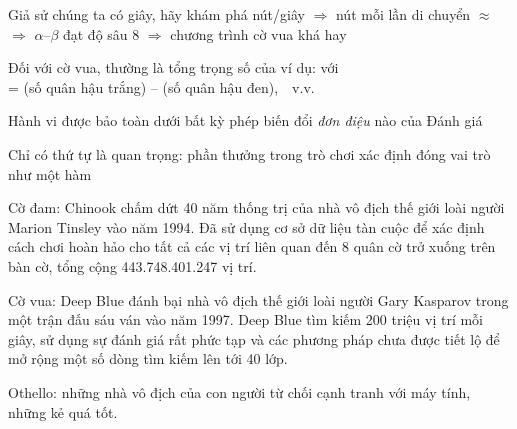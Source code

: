 \documentclass{article}
\begin{document}
\begin{huge}
Giả sử chúng ta có  giây, hãy khám phá  nút/giây\nl
$\Rightarrow$  nút mỗi lần di chuyển $\approx$ \nl
$\Rightarrow$ $\alpha$--$\beta$ đạt độ sâu 8 $\Rightarrow$ chương trình cờ vua khá hay



\vspace*{0.2in}

\textwidth
{}

Đối với cờ vua, thường là tổng trọng số  của 
\mat{\[
{\sc Eval}(s) = w_1 f_1(s) + w_2 f_2(s) + \ldots + w_n f_n(s)
\]}
ví dụ:  với \\
 = (số quân hậu trắng) -- (số quân hậu đen),\ \ v.v.





\vspace*{0.3in}

\textwidth
{}

Hành vi được bảo toàn dưới bất kỳ phép biến đổi \emph{đơn điệu} nào của
{\sc Đánh giá}

Chỉ có thứ tự là quan trọng:\nl
phần thưởng trong trò chơi xác định đóng vai trò như một hàm 




Cờ đam: Chinook chấm dứt 40 năm thống trị của nhà vô địch thế giới loài người Marion
Tinsley vào năm 1994. Đã sử dụng cơ sở dữ liệu tàn cuộc để xác định cách chơi hoàn hảo cho
tất cả các vị trí liên quan đến 8 quân cờ trở xuống trên bàn cờ, tổng cộng
443.748.401.247 vị trí.

Cờ vua: Deep Blue đánh bại nhà vô địch thế giới loài người Gary Kasparov
trong một trận đấu sáu ván vào năm 1997. Deep Blue tìm kiếm 200 triệu vị trí
mỗi giây, sử dụng sự đánh giá rất phức tạp và các phương pháp chưa được tiết lộ để
mở rộng một số dòng tìm kiếm lên tới 40 lớp.

Othello: những nhà vô địch của con người từ chối cạnh tranh với máy tính, những kẻ
quá tốt.


\end{huge}
\end{document}
